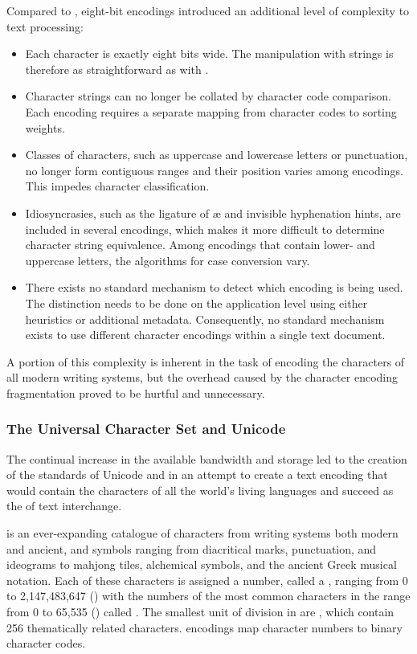 \documentclass[a5paper,10pt]{book}
\begin{document}
Compared to , eight-bit encodings introduced an additional level
of complexity to text processing:
\begin{itemize}
  \item Each character is exactly eight bits wide. The manipulation with strings
    is therefore as straightforward as with .
  \item Character strings can no longer be collated by character code
    comparison. Each encoding requires a separate mapping from character codes
    to sorting weights.
  \item Classes of characters, such as uppercase and lowercase letters or
    punctuation, no longer form contiguous ranges and their position varies
    among encodings. This impedes character classification.
  \item Idiosyncrasies, such as the ligature of æ and invisible hyphenation
    hints, are included in several encodings, which makes it more difficult to
    determine character string equivalence. Among encodings that contain lower-
    and uppercase letters, the algorithms for case conversion vary.
  \item There exists no standard mechanism to detect which encoding is being
    used. The distinction needs to be done on the application level using either
    heuristics or additional metadata. Consequently, no standard mechanism
    exists to use different character encodings within a single text document.
\end{itemize}
A portion of this complexity is inherent in the task of encoding the characters
of all modern writing systems, but the overhead caused by the character encoding
fragmentation proved to be hurtful and unnecessary.

\subsubsection{The Universal Character Set and Unicode}
The continual increase in the available bandwidth and storage led to the
creation of the standards of Unicode \cite{unicode91,unicode92} and
 in an attempt to create a text encoding that would
contain the characters of all the world's living languages and succeed
 as the  of text interchange.

 is an ever-expanding catalogue of characters from writing systems
both modern and ancient, and symbols ranging from diacritical marks,
punctuation, and ideograms to mahjong tiles, alchemical symbols, and the ancient
Greek musical notation. Each of these characters is assigned a number, called
a , ranging from 0 to 2,147,483,647 () with the
numbers of the most common characters in the range from 0 to 65,535
() called . The smallest unit of division in
 are , which contain 256
thematically related characters.  encodings map character numbers
to binary character codes.
\end{document}
